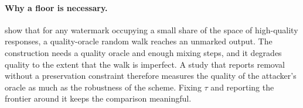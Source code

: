 \paragraph{Why a floor is necessary.}
\citet{sand} show that for any watermark occupying a small share of the space of high-quality responses, a quality-oracle random walk reaches an unmarked output. The construction needs a quality oracle and enough mixing steps, and it degrades quality to the extent that the walk is imperfect. A study that reports removal without a preservation constraint therefore measures the quality of the attacker's oracle as much as the robustness of the scheme. Fixing $\tau$ and reporting the frontier around it keeps the comparison meaningful.
